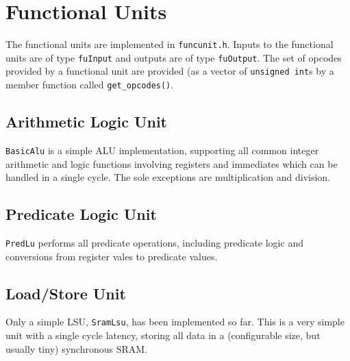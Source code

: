 \documentclass[10pt,twocolumn]{article}
\begin{document}
\section{Functional Units}

The functional units are implemented in \texttt{funcunit.h}.
Inputs to the functional units are of type \texttt{fuInput} and outputs are of type \texttt{fuOutput}.
The set of opcodes provided by a functional unit are provided (as a vector of \texttt{unsigned int}s by a member function called \texttt{get\_opcodes()}.

\subsection{Arithmetic Logic Unit}

\texttt{BasicAlu} is a simple ALU implementation, supporting all common integer arithmetic and logic functions involving registers and immediates which can be handled in a single cycle.
The sole exceptions are multiplication and division.

\subsection{Predicate Logic Unit}

\texttt{PredLu} performs all predicate operations, including predicate logic and conversions from register vales to predicate values.

\subsection{Load/Store Unit}

Only a simple LSU, \texttt{SramLsu}, has been implemented so far.
This is a very simple unit with a single cycle latency, storing all data in a (configurable size, but usually tiny) synchronous SRAM.
\end{document}
